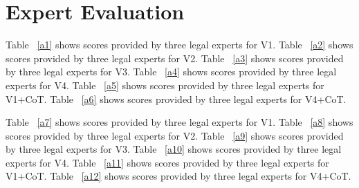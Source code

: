 \newpage
\appendix

\section{Expert Evaluation}
\label{sec:Expert-Evaluation}
Table ~\ref{a1} shows scores provided by three legal experts for V1. Table ~\ref{a2} shows scores provided by three legal experts for V2.
Table ~\ref{a3} shows scores provided by three legal experts for V3.
Table ~\ref{a4} shows scores provided by three legal experts for V4. Table ~\ref{a5} shows scores provided by three legal experts for V1+CoT. Table ~\ref{a6} shows scores provided by three legal experts for V4+CoT.

Table ~\ref{a7} shows scores provided by three legal experts for V1. Table ~\ref{a8} shows scores provided by three legal experts for V2.
Table ~\ref{a9} shows scores provided by three legal experts for V3.
Table ~\ref{a10} shows scores provided by three legal experts for V4. Table ~\ref{a11} shows scores provided by three legal experts for V1+CoT. Table ~\ref{a12} shows scores provided by three legal experts for V4+CoT.

